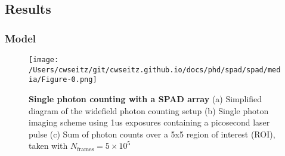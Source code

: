 


\subsection{Results}

\subsubsection{Model}

\begin{figure*}[t]
\centering
\texttt{[image: /Users/cwseitz/git/cwseitz.github.io/docs/phd/spad/spad/media/Figure-0.png]}
\caption{\textbf{Single photon counting with a SPAD array} (a) Simplified diagram of the widefield photon counting setup (b) Single photon imaging scheme using 1us exposures containing a picosecond laser pulse (c) Sum of photon counts over a 5x5 region of interest (ROI), taken with $N_{\mathrm{frames}}=5\times 10^{5}$}
\label{fig:fig5}
\end{figure*}    

